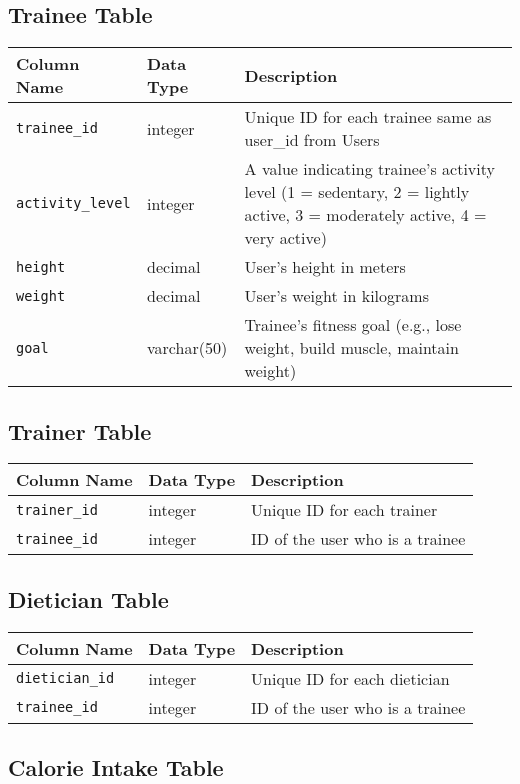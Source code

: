 \documentclass{article}
\begin{document}
\subsection*{Trainee Table}

\begin{tabular}{lll}
\toprule
Column Name & Data Type & Description \\
\midrule
\verb!trainee_id! & integer & Unique ID for each trainee same as user\_id from Users\\
\verb!activity_level! & integer & A value indicating trainee's activity level (1 = sedentary, 2 = lightly active, 3 = moderately active, 4 = very active) \\
\verb!height! & decimal & User's height in meters \\
\verb!weight! & decimal & User's weight in kilograms \\
\verb!goal! & varchar(50) & Trainee's fitness goal (e.g., lose weight, build muscle, maintain weight) \\
\bottomrule
\end{tabular}

\subsection*{Trainer Table}

\begin{tabular}{lll}
\toprule
Column Name & Data Type & Description \\
\midrule
\verb!trainer_id! & integer & Unique ID for each trainer \\
\verb!trainee_id! & integer & ID of the user who is a trainee \\
\bottomrule
\end{tabular}

\subsection*{Dietician Table}

\begin{tabular}{lll}
\toprule
Column Name & Data Type & Description \\
\midrule
\verb!dietician_id! & integer & Unique ID for each dietician \\
\verb!trainee_id! & integer & ID of the user who is a trainee \\
\bottomrule
\end{tabular}

\subsection*{Calorie Intake Table}
\end{document}
